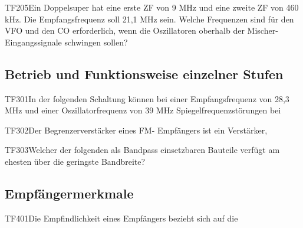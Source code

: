 \begin{question}{TF205}{Ein Doppelsuper hat eine erste ZF von 9 MHz und eine zweite ZF von 460 kHz. Die Empfangsfrequenz soll 21,1 MHz sein. Welche Frequenzen sind für den VFO und den CO erforderlich, wenn die Oszillatoren oberhalb der Mischer-Eingangssignale schwingen sollen?}
\end{question}

\subsection{Betrieb und Funktionsweise einzelner Stufen}

\begin{question}{TF301}{In der folgenden Schaltung können bei einer Empfangsfrequenz von 28,3 MHz und einer Oszillatorfrequenz von 39 MHz Spiegelfrequenzstörungen bei}
\end{question}

\begin{question}{TF302}{Der Begrenzerverstärker eines FM- Empfängers ist ein Verstärker,}
\end{question}

\begin{question}{TF303}{Welcher der folgenden als Bandpass einsetzbaren Bauteile verfügt am ehesten über die geringste Bandbreite?}
\end{question}

\subsection{Empfängermerkmale}

\begin{question}{TF401}{Die Empfindlichkeit eines Empfängers bezieht sich auf die}
\end{question}

